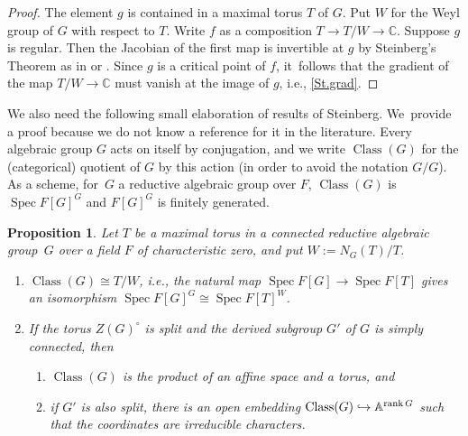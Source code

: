 \documentclass[JEP,XML,SOM,Unicode,NoFloatCountersInSection,published]{cedram}
\newenvironment{enumeratea}
{\bgroup\def\theenumi{\alph{enumi}}\def\theenumii{\roman{enumii}}\begin{enumerate}}
{\end{enumerate}\egroup}
\newcommand\hto{\mathrel{\lhook\joinrel\to}}
\newtheorem{prop}[equation]{Proposition}
\theoremstyle{definition}
\let\ic\circ
\newcommand{\A}{\mathbb{A}}
\newcommand{\C}{\mathbb{C}}
\DeclareMathOperator{\Spec}{Spec}
\DeclareMathOperator{\class}{Class}
\newcommand{\ClG}{\class(G)}
\DeclareMathOperator{\rank}{rank}
\begin{document}
\begin{proof}
The element $g$ is contained in a maximal torus $T$ of $G$. Put $W$ for the Weyl group of $G$ with respect to $T$. Write $f$ as a composition
$T \to T/W \to \C$. Suppose $g$ is regular. Then the Jacobian of the first map is invertible at $g$ by Steinberg's Theorem as in \cite{St:inv} or \cite[6.1, 6.3]{St:reg}. Since $g$ is a critical point of $f$, it~follows that the gradient of the map $T/W \to \C$ must vanish at the image of $g$, i.e., \eqref{St.grad}.
\end{proof}

We also need the following small elaboration of results of Steinberg. We~provide a proof because we do not know a reference for it in the literature. Every algebraic group $G$ acts on itself by conjugation, and we write $\ClG$ for the (categorical) quotient of $G$ by this action (in order to avoid the notation $G/G$). As a scheme, for~$G$ a reductive algebraic group over $F$, $\ClG$ is $\Spec F[G]^G$ and $F[G]^G$ is finitely generated.

\begin{prop} \label{torus.prod}
Let $T$ be a maximal torus in a connected reductive algebraic group~$G$ over a field $F$ of characteristic zero, and put $W := N_G(T)/T$.
\begin{enumeratea}
\item \label{St.inv.iso} $\ClG \cong T/W$, i.e., the natural map $\Spec F[G] \to \Spec F[T]$ gives an isomorphism $\Spec F[G]^G \cong \Spec F[T]^W$.
\item \label{St.inv.prod} If the torus $Z(G)^\ic$ is split and the derived subgroup $G'$ of $G$ is simply connected, then
	\begin{enumerate}
	\item \label{St.inv.prod1} $\ClG$ is the product of an affine space and a torus, and
	\item \label{St.inv.prod2} if $G'$ is also split, there is an open
embedding $\ClG \hto \A^{\rank G}$ such that the
coordinates are irreducible characters.
	\end{enumerate}
\end{enumeratea}
\end{prop}
\end{document}
